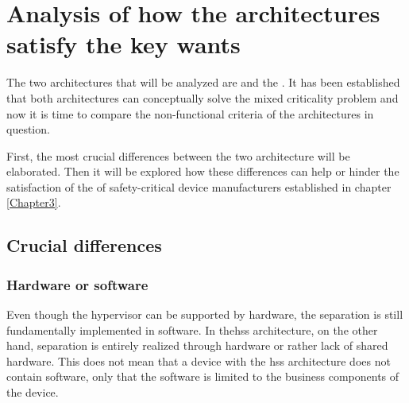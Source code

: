 
\chapter{Analysis of how the architectures satisfy the key wants} %

\label{Chapter4} %




The two architectures that will be analyzed are  and the . It has been established that both architectures can conceptually solve the mixed criticality problem and now it is time to compare the non-functional criteria of the architectures in question. 

First, the most crucial differences between the two architecture will be elaborated. Then it will be explored how these differences can help or hinder the satisfaction of the  of safety-critical device manufacturers established in chapter \ref{Chapter3}. 

\section{Crucial differences}
\subsection{Hardware or software}
Even though the hypervisor can be supported by hardware, the separation is still fundamentally implemented in software. In the\acrshort{hss} architecture, on the other hand, separation is entirely realized through hardware or rather lack of shared hardware. This does not mean that a device with the \acrshort{hss} architecture does not contain software, only that the software is limited to the business components of the device.

